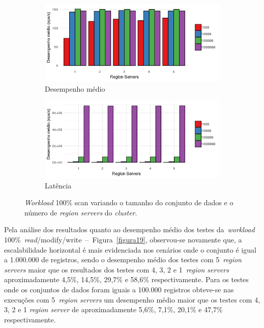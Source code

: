 \documentclass[12pt]{article}
\begin{document}
\begin{figure}
    \centering
    \begin{subfigure}[b]{0.49\textwidth}   
        \centering 
        \includegraphics[width=\textwidth]{images/figura21}
        \caption{Desempenho médio}
        \label{figura21}
    \end{subfigure}
    \begin{subfigure}[b]{0.49\textwidth}   
        \centering 
        \includegraphics[width=\textwidth]{images/figura22}
        \caption{Latência}
        \label{figura22}
    \end{subfigure}
    \caption{\emph{Workload} 100\% scan variando o tamanho do conjunto de dados e o número de \emph{region servers} do \emph{cluster}.}
\end{figure}

Pela análise dos resultados quanto ao desempenho médio dos testes da~\emph{workload} 100\%~\emph{read}/modify/write~--~Figura~\ref{figura19}, observou-se novamente que, a escalabilidade horizontal é mais evidenciada nos cenários onde o conjunto é igual a 1.000.000 de registros, sendo o desempenho médio dos testes com 5~\emph{region servers} maior que os resultados dos testes com 4, 3, 2 e 1~\emph{region servers} aproximadamente 4,5\%, 14,5\%, 29,7\% e 58,6\% respectivamente. Para os testes onde os conjuntos de dados foram iguais a 100.000 registros obteve-se nas execuções com 5~\emph{region servers} um desempenho médio maior que os testes com 4, 3, 2 e 1 \emph{region server} de aproximadamente 5,6\%, 7,1\%, 20,1\% e 47,7\% respectivamente.
\end{document}
